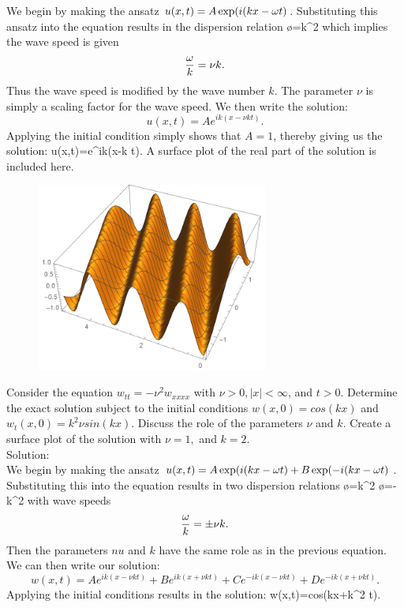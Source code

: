 We begin by making the ansatz $u(x,t)=A \exp(i(kx-\omega t)$. Substituting this ansatz into the equation results in the dispersion relation
\bq\o=\nu k^2\eq
which implies the wave speed is given
$$ \frac{\omega}{k}=\nu k.$$
Thus the wave speed is modified by the wave number $k$. The parameter $\nu$ is simply a scaling factor for the wave speed. We then write the solution:
$$u(x,t)=Ae^{ik(x-\nu kt)}.$$
Applying the initial condition simply shows that $A=1$, thereby giving us the solution:
\bq u(x,t)=e^{ik(x-\nu k t)}.\eq
A surface plot of the real part of the solution is included here.
\begin{figure}[h]
\centering
\includegraphics[width=3in]{surf_linear_schrodinger}
\end{figure}

\item Consider the equation $w_{tt}=-\nu^2 w_{xxxx}$ with $\nu>0,|x|<\infty$, and $t>0.$ Determine the exact solution subject to the initial conditions $w(x,0)=cos(kx)$ and $w_t(x,0)=k^2\nu sin(kx)$. Discuss the role of the parameters $\nu$ and $k$. Create a surface plot of the solution with $\nu=1,$ and $k=2.$\\

Solution:\\

We begin by making the ansatz $u(x,t)=A\exp(i(kx-\omega t)+B\exp(-i(kx-\omega t)$. Substituting this into the equation results in two dispersion relations
\bq \o =\nu k^2\;\;\;\;\;\; \o=-\nu k^2\eq 
with wave speeds
$$\frac{\omega}{k}=\pm \nu k.$$
Then the parameters $nu$ and $k$ have the same role as in the previous equation. We can then write our solution:
$$w(x,t)=A e^{ik(x-\nu kt)}+Be^{ik(x+\nu kt)}+C e^{-ik(x-\nu kt)}+D e^{-ik(x+\nu kt)}.$$
Applying the initial conditions results in the solution:
\bq w(x,t)=cos(kx+\nu k^2 t).\eq

